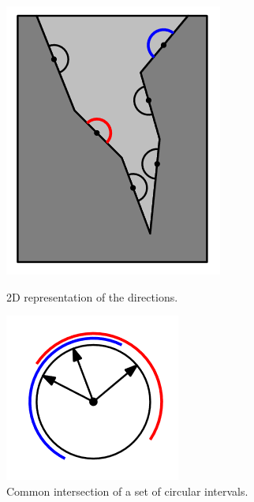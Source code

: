 \documentclass[11pt]{article}
\begin{document}
\begin{enumerate}
    
\begin{figure}[ht] 
  \label{fig:cast} 
  \begin{minipage}[b]{0.5\linewidth}
    \centering
    \includegraphics[width=.7\linewidth]{castingpolyhedron1}
    \caption{2D representation of the directions.} 
    \vspace{4ex}
  \end{minipage}%
  \begin{minipage}[b]{0.5\linewidth}
    \centering
    \includegraphics[width=.7\linewidth]{castingpolyhedron2}
    \caption{Common intersection of a set of circular intervals.} 
    \vspace{4ex}
  \end{minipage} 

\end{figure}
\end{enumerate}
\end{document}
